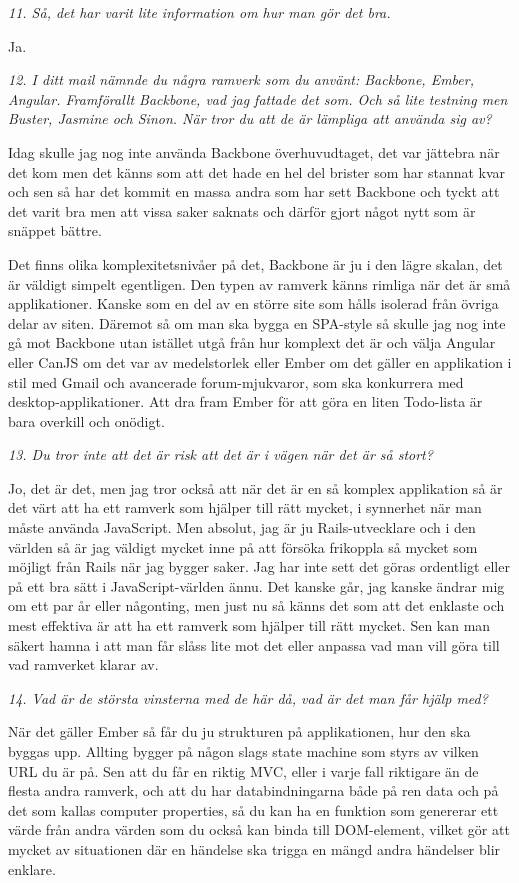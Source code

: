 \documentclass[11pt]{article}
\begin{document}
\emph{11. Så, det har varit lite information om hur man gör det bra.}

Ja.

\emph{12. I ditt mail nämnde du några ramverk som du använt: Backbone, Ember, Angular. Framförallt Backbone, vad jag fattade det som. Och så lite testning men Buster, Jasmine och Sinon. När tror du att de är lämpliga att använda sig av?}

Idag skulle jag nog inte använda Backbone överhuvudtaget, det var jättebra när det kom men det känns som att det hade en hel del brister som har stannat kvar och sen så har det kommit en massa andra som har sett Backbone och tyckt att det varit bra men att vissa saker saknats och därför gjort något nytt som är snäppet bättre.

Det finns olika komplexitetsnivåer på det, Backbone är ju i den lägre skalan, det är väldigt simpelt egentligen. Den typen av ramverk känns rimliga när det är små applikationer. Kanske som en del av en större site som hålls isolerad från övriga delar av siten. Däremot så om man ska bygga en SPA-style så skulle jag nog inte gå mot Backbone utan istället utgå från hur komplext det är och välja Angular eller CanJS om det var av medelstorlek eller Ember om det gäller en applikation i stil med Gmail och avancerade forum-mjukvaror, som ska konkurrera med desktop-applikationer. Att dra fram Ember för att göra en liten Todo-lista är bara overkill och onödigt.

\emph{13. Du tror inte att det är risk att det är i vägen när det är så stort?}

Jo, det är det, men jag tror också att när det är en så komplex applikation så är det värt att ha ett ramverk som hjälper till rätt mycket, i synnerhet när man måste använda JavaScript. Men absolut, jag är ju Rails-utvecklare och i den världen så är jag väldigt mycket inne på att försöka frikoppla så mycket som möjligt från Rails när jag bygger saker. Jag har inte sett det göras ordentligt eller på ett bra sätt i JavaScript-världen ännu. Det kanske går, jag kanske ändrar mig om ett par år eller någonting, men just nu så känns det som att det enklaste och mest effektiva är att ha ett ramverk som hjälper till rätt mycket. Sen kan man säkert hamna i att man får slåss lite mot det eller anpassa vad man vill göra till vad ramverket klarar av.

\emph{14. Vad är de största vinsterna med de här då, vad är det man får hjälp med?}

När det gäller Ember så får du ju strukturen på applikationen, hur den ska byggas upp. Allting bygger på någon slags state machine som styrs av vilken URL du är på. Sen att du får en riktig MVC, eller i varje fall riktigare än de flesta andra ramverk, och att du har databindningarna både på ren data och på det som kallas computer properties, så du kan ha en funktion som genererar ett värde från andra värden som du också kan binda till DOM-element, vilket gör att mycket av situationen där en händelse ska trigga en mängd andra händelser blir enklare.
\end{document}
